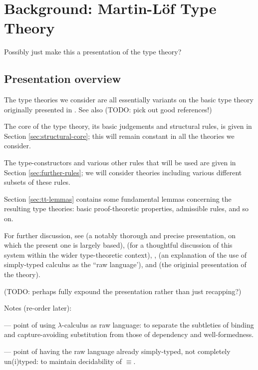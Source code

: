
\chapter{Background: Martin-L\"o{}f Type Theory}

Possibly just make this a presentation of the type theory?

\section{Presentation overview}

\para The type theories we consider are all essentially variants on the basic type theory originally presented in \cite{ML:predicative-part}.  See also (TODO: pick out good references!)

The core of the type theory, its basic judgements and structural rules, is given in Section \ref{sec:structural-core}; this will remain constant in all the theories we consider.

The type-constructors and various other rules that will be used are given in Section \ref{sec:further-rules}; we will consider theories including various different subsets of these rules.

Section \ref{sec:tt-lemmas} contains some fundamental lemmas concerning the resulting type theories: basic proof-theoretic properties, admissible rules, and so on.

For further discussion, see \cite{pitts:cat-logic} (a notably thorough and precise presentation, on which the present one is largely based), \cite[\S6]{jacobs:book} (for a thoughtful discussion of this system within the wider type-theoretic context), \cite{hofmann:syntax-and-semantics}, \cite[Ch.3]{n-p-s:programming} (an explanation of the use of simply-typed calculus as the ``raw language'), and \cite{martin-loef:predicative-part} (the originial presentation of the theory).
 
(TODO: perhaps fully expound the presentation rather than just recapping?)

Notes (re-order later):

--- point of using $\lambda$-calculus as raw language: to separate the subtleties of binding and capture-avoiding substitution from those of dependency and well-formedness.

--- point of having the raw language already simply-typed, not completely un(i)typed: to maintain decidability of $\equiv$. 

